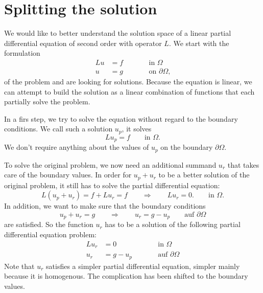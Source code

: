 %
%
%
\section{Splitting the solution}
We would like to better understand the solution space of a linear partial
differential equation of second order with operator $L$.
We start with the formulation
\begin{equation}
\begin{aligned}
Lu&=f&&\qquad\text{in $\Omega$}\\
 u&=g&&\qquad\text{on $\partial\Omega$,}
\end{aligned}
\label{pdgl2ord:allg}
\end{equation}
of the problem and are looking for solutions.
Because the equation is linear, we can attempt to build the solution
as a linear combination of functions that each partially solve the
problem.

In a firs step, we try to solve the equation without regard to the
boundary conditions.
We call such a solution $u_p$, it solves
\begin{equation}
Lu_p=f\qquad\text{in $\Omega$.}
\label{pdgl2ord:up}
\end{equation}
We don't require anything about the values of $u_p$ on the boundary
$\partial\Omega$.

To solve the original problem, we now need an additional summand $u_r$
that takes care of the boundary values.
In order for $u_p+u_r$ to be a better solution of the original problem,
it still has to solve the partial differential equation:
\[
L(u_p+u_r)=f+Lu_r=f\qquad\Rightarrow\qquad Lu_r=0.
\qquad\text{in $\Omega$.}
\]
In addition, we want to make sure that the boundary conditions
\[
u_p+u_r=g\qquad\Rightarrow\qquad u_r=g-u_p\qquad\text{auf $\partial\Omega$}
\]
are satisfied.
So the function $u_r$ has to be a solution of the following partial
differential equation problem:
\begin{equation}
\begin{aligned}
Lu_r&=0&&\qquad\text{in $\Omega$}\\
 u_r&=g-u_p&&\qquad\text{auf $\partial\Omega$}
\end{aligned}
\label{pdgl2ord:ur}
\end{equation}
Note that $u_r$ satisfies a simpler partial differential equation,
simpler mainly because it is homogenous.
The complication has been shifted to the boundary values.

